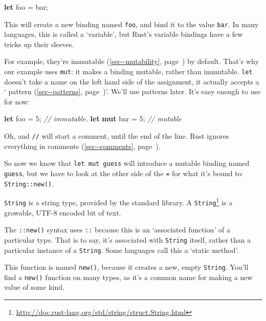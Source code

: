 \documentclass[a4paper,]{book}
\renewcommand*{\hyperref}[2][\ar]{%
  \def\ar{#2}%
  #2 (\autoref{#1}, page~\pageref{#1})}
\newenvironment{Shaded}{\begin{snugshade}}{\end{snugshade}}
\newcommand{\KeywordTok}[1]{\textcolor[rgb]{0.13,0.29,0.53}{\textbf{{#1}}}}
\newcommand{\DecValTok}[1]{\textcolor[rgb]{0.00,0.00,0.81}{{#1}}}
\newcommand{\CommentTok}[1]{\textcolor[rgb]{0.56,0.35,0.01}{\textit{{#1}}}}
\newcommand{\NormalTok}[1]{{#1}}
\renewcommand{\href}[2]{#2\footnote{\url{#1}}}
\begin{document}
\begin{Shaded}
\begin{Highlighting}[]
\KeywordTok{let} \NormalTok{foo = bar;}
\end{Highlighting}
\end{Shaded}

This will create a new binding named \texttt{foo}, and bind it to the
value \texttt{bar}. In many languages, this is called a `variable', but
Rust's variable bindings have a few tricks up their sleeves.

For example, they're \hyperref[sec--mutability]{immutable} by default.
That's why our example uses \texttt{mut}: it makes a binding mutable,
rather than immutable. \texttt{let} doesn't take a name on the left hand
side of the assignment, it actually accepts a
`\hyperref[sec--patterns]{pattern}'. We'll use patterns later. It's easy
enough to use for now:

\begin{Shaded}
\begin{Highlighting}[]
\KeywordTok{let} \NormalTok{foo = }\DecValTok{5}\NormalTok{; }\CommentTok{// immutable.}
\KeywordTok{let} \KeywordTok{mut} \NormalTok{bar = }\DecValTok{5}\NormalTok{; }\CommentTok{// mutable}
\end{Highlighting}
\end{Shaded}

Oh, and \texttt{//} will start a comment, until the end of the line.
Rust ignores everything in \hyperref[sec--comments]{comments}.

So now we know that \texttt{let\ mut\ guess} will introduce a mutable
binding named \texttt{guess}, but we have to look at the other side of
the \texttt{=} for what it's bound to: \texttt{String::new()}.

\texttt{String} is a string type, provided by the standard library. A
\href{http://doc.rust-lang.org/std/string/struct.String.html}{\texttt{String}}
is a growable, UTF-8 encoded bit of text.

The \texttt{::new()} syntax uses \texttt{::} because this is an
`associated function' of a particular type. That is to say, it's
associated with \texttt{String} itself, rather than a particular
instance of a \texttt{String}. Some languages call this a `static
method'.

This function is named \texttt{new()}, because it creates a new, empty
\texttt{String}. You'll find a \texttt{new()} function on many types, as
it's a common name for making a new value of some kind.
\end{document}
